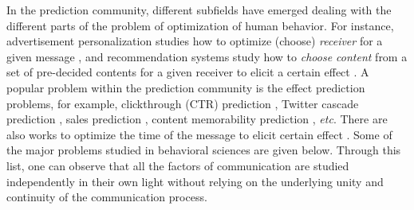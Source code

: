 In the prediction community, different subfields have emerged dealing with the different parts of the problem of optimization of human behavior. For instance, advertisement personalization studies how to optimize (choose) \textit{receiver} for a given message \cite{chandra2022personalization}, and recommendation systems study how to \textit{choose content} from a set of pre-decided contents for a given receiver to elicit a certain effect \cite{herlocker2004evaluating}. A popular problem within the prediction community is the effect prediction problems, for example, clickthrough (CTR) prediction \cite{mcmahan2013ad}, Twitter cascade prediction \cite{cheng2014can,martin2016exploring}, sales prediction \cite{choi2012predicting,pryzant2017predicting}, content memorability prediction \cite{isola2011makes,khosla2015understanding,si2023long}, \textit{etc}. There are also works to optimize the time of the message to elicit certain effect \cite{newstead2010cost,si2023long}. Some of the major problems studied in behavioral sciences are given below. Through this list, one can observe that all the factors of communication are studied independently in their own light without relying on the underlying unity and continuity of the communication process. 


